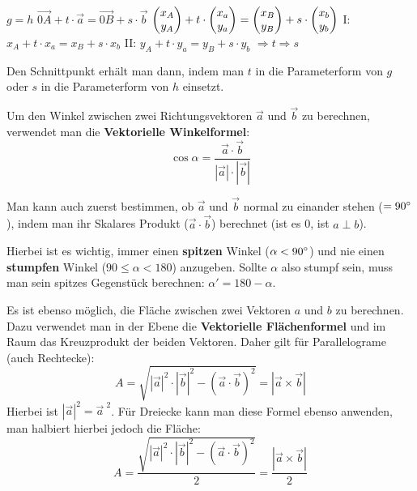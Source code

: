 \begin{itemize}
  \begin{center}
    $g = h$
    \extrapar
    $\vec{0A} + t \cdot \vec{a} = \vec{0B} + s \cdot \vec{b}$
    \extrapar
    $\begin{pmatrix}x_{A}\\y_{A}\end{pmatrix} + t \cdot \begin{pmatrix}x_{a}\\y_{a}\end{pmatrix} = \begin{pmatrix}x_{B}\\y_{B}\end{pmatrix} + s \cdot \begin{pmatrix}x_{b}\\y_{b}\end{pmatrix}$
    \extrapar
    I: $x_{A} + t \cdot x_{a} = x_{B} + s \cdot x_{b}$
    \extrapar
    II: $y_{A} + t \cdot y_{a} = y_{B} + s \cdot y_{b}$
    \extrapar
    $\Rightarrow t \Rightarrow s$
  \end{center}

  Den Schnittpunkt erh\"{a}lt man dann, indem man $t$ in die Parameterform von $g$ oder $s$ in die Parameterform von $h$ einsetzt.

\end{itemize}

\pagebreak


Um den Winkel zwischen zwei Richtungsvektoren $\vec{a}$ und $\vec{b}$ zu berechnen, verwendet man die \textbf{Vektorielle Winkelformel}:
$$ \cos \alpha = \frac{\vec{a} \cdot \vec{b}}{|\vec{a}| \cdot |\vec{b}|}$$

Man kann auch zuerst bestimmen, ob $\vec{a}$ und $\vec{b}$ normal zu einander stehen ($= 90\degree$), indem man ihr Skalares Produkt ($\vec{a} \cdot \vec{b}$) berechnet (ist es 0, ist $a \perp b$).

Hierbei ist es wichtig, immer einen \textbf{spitzen} Winkel ($\alpha < 90\degree$) und nie einen \textbf{stumpfen} Winkel ($90 \leq \alpha < 180$) anzugeben. Sollte $\alpha$ also stumpf sein, muss man sein spitzes Gegenst\"{u}ck berechnen: $\alpha{}' = 180 - \alpha$.


Es ist ebenso m\"{o}glich, die Fl\"{a}che zwischen zwei Vektoren $a$ und $b$ zu berechnen. Dazu verwendet man in der Ebene die \textbf{Vektorielle Fl\"{a}chenformel} und im Raum das Kreuzprodukt der beiden Vektoren. Daher gilt f\"{u}r Parallelograme (auch Rechtecke): $$ A = \sqrt{{|\vec{a}|}^2 \cdot {|\vec{b}|}^2 - {(\vec{a} \cdot \vec{b})}^2} = |\vec{a} \times \vec{b}| $$ Hierbei ist $|\vec{a}|^2 = \vec{a}^{\,\,2}$. F\"{u}r Dreiecke kann man diese Formel ebenso anwenden, man halbiert hierbei jedoch die Fl\"{a}che: $$A = \frac{\sqrt{{|\vec{a}|}^2 \cdot {|\vec{b}|}^2 - {(\vec{a} \cdot \vec{b})}^2}}{2} = \frac{|\vec{a} \times \vec{b}|}{2}$$

